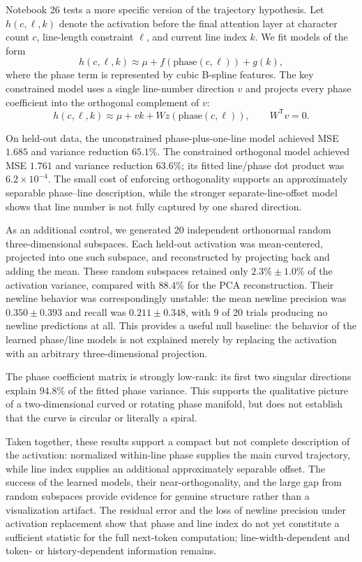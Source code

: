 \documentclass[11pt]{article}
\begin{document}
Notebook 26 tests a more specific version of the trajectory hypothesis. Let
$h(c,\ell,k)$ denote the activation before the final attention layer at
character count $c$, line-length constraint $\ell$, and current line index
$k$. We fit models of the form
\[
 h(c,\ell,k) \approx \mu + f(\text{phase}(c,\ell)) + g(k),
\]
where the phase term is represented by cubic B-spline features. The key
constrained model uses a single line-number direction $v$ and projects every
phase coefficient into the orthogonal complement of $v$:
\[
 h(c,\ell,k) \approx \mu + v k + W z(\text{phase}(c,\ell)),
 \qquad W^{\mathsf T}v=0.
\]

On held-out data, the unconstrained phase-plus-one-line model achieved MSE
$1.685$ and variance reduction $65.1\%$. The constrained orthogonal model
achieved MSE $1.761$ and variance reduction $63.6\%$; its fitted line/phase
dot product was $6.2\times 10^{-4}$. The small cost of enforcing
orthogonality supports an approximately separable phase--line description,
while the stronger separate-line-offset model shows that line number is not
fully captured by one shared direction.

As an additional control, we generated 20 independent orthonormal random
three-dimensional subspaces. Each held-out activation was mean-centered,
projected into one such subspace, and reconstructed by projecting back and
adding the mean. These random subspaces retained only $2.3\%\pm1.0\%$ of the
activation variance, compared with $88.4\%$ for the PCA reconstruction. Their
newline behavior was correspondingly unstable: the mean newline precision was
$0.350\pm0.393$ and recall was $0.211\pm0.348$, with 9 of 20 trials producing
no newline predictions at all. This provides a useful null baseline: the
behavior of the learned phase/line models is not explained merely by replacing
the activation with an arbitrary three-dimensional projection.

The phase coefficient matrix is strongly low-rank: its first two singular
directions explain $94.8\%$ of the fitted phase variance. This supports the
qualitative picture of a two-dimensional curved or rotating phase manifold,
but does not establish that the curve is circular or literally a spiral.

Taken together, these results support a compact but not complete description
of the activation: normalized within-line phase supplies the main curved
trajectory, while line index supplies an additional approximately separable
offset. The success of the learned models, their near-orthogonality, and the
large gap from random subspaces provide evidence for genuine structure rather
than a visualization artifact. The residual error and the loss of newline
precision under activation replacement show that phase and line index do not
yet constitute a sufficient statistic for the full next-token computation;
line-width-dependent and token- or history-dependent information remains.
\end{document}
